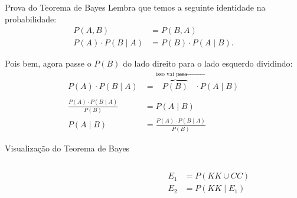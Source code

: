 \begin{frame}{Prova do Teorema de Bayes}
    Lembra que temos a seguinte identidade na probabilidade:
    $$
    \begin{aligned}
    P(A,B) &= P(B,A) \\
    P(A) \cdot P(B \mid A) &= P(B) \cdot P(A \mid B).
    \end{aligned}
    $$

    Pois bem, agora passe o $P(B)$ do lado direito para o lado esquerdo dividindo:
    $$
    \begin{aligned}
    P(A) \cdot P(B \mid A) &= \overbrace{P(B)}^{\text{isso vai para $\leftarrow$}} \cdot P(A \mid B) \\
    &\\
    \frac{P(A) \cdot P(B \mid A)}{P(B)} &= P(A \mid B) \\
    P(A \mid B) &= \frac{P(A) \cdot P(B \mid A)}{P(B)}
    \end{aligned}
    $$
\end{frame}

\begin{frame}{Visualização do Teorema de Bayes}
    \begin{columns}
        \begin{column}{0.6\textwidth}
        \end{column}
        \begin{column}{0.4\textwidth}
            $$
            \begin{aligned}
                E_1 &= P(KK  \cup CC) \\
                E_2 &= P(KK \mid E_1)
            \end{aligned}
            $$
        \end{column}
    \end{columns}
\end{frame}

